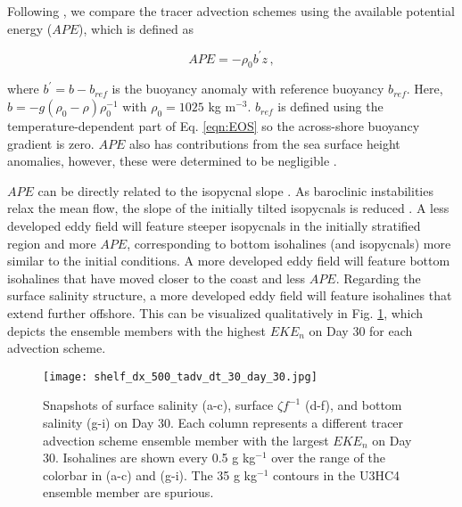 \documentclass[draft]{agujournal2019}
\begin{document}
Following , we compare the tracer advection schemes using the available potential energy ($APE$), which is defined as 
\begin{linenomath*}
    \begin{equation}
        APE = -\rho_0 b^\prime z \, , 
    \end{equation}
\end{linenomath*}
where $b^\prime = b-b_{ref}$ is the buoyancy anomaly with reference buoyancy $b_{ref}$. Here, $b = -g(\rho_{0}-\rho)\rho_0^{-1}$ with $\rho_0=1025$ kg m$^{-3}$. $b_{ref}$ is defined using the temperature-dependent part of Eq. \ref{eqn:EOS} so the across-shore buoyancy gradient is zero. $APE$ also has contributions from the sea surface height anomalies, however, these were determined to be negligible \cite<not shown, see Appendix B of>[]{Hetland_2017}. 

$APE$ can be directly related to the isopycnal slope \cite{brink2016continental1, brink2016continental2}. As baroclinic instabilities relax the mean flow, the slope of the initially tilted isopycnals is reduced \cite{Hetland_2017, zhang2018study}. A less developed eddy field will feature steeper isopycnals in the initially stratified region and more $APE$, corresponding to bottom isohalines (and isopycnals) more similar to the initial conditions. A more developed eddy field will feature bottom isohalines that have moved closer to the coast and less $APE$. Regarding the surface salinity structure, a more developed eddy field will feature isohalines that extend further offshore. This can be visualized qualitatively in Fig. \ref{fig:isohalines}, which depicts the ensemble members with the highest $EKE_n$ on Day 30 for each advection scheme.

\begin{figure}[t]
    \begin{center}
    \texttt{[image: shelf\_dx\_500\_tadv\_dt\_30\_day\_30.jpg]}\\
    \caption{Snapshots of surface salinity (a-c), surface $\zeta f^{-1}$ (d-f), and bottom salinity (g-i) on Day 30. Each column represents a different tracer advection scheme ensemble member with the largest $EKE_n$ on Day 30. Isohalines are shown every 0.5 g kg$^{-1}$ over the range of the colorbar in (a-c) and (g-i). The 35 g kg$^{-1}$ contours in the U3HC4 ensemble member are spurious.} \label{fig:isohalines}
     \end{center} 
\end{figure}
\end{document}
